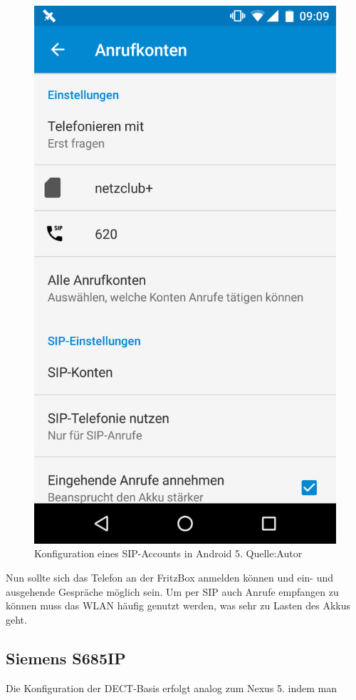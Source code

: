\documentclass[a4paper,12pt]{scrbook}
\begin{document}
\begin{figure}[H]
\begin{center}
\includegraphics[width=.4\hsize]{./images/voip-client-nexus5.png}
\end{center}
\caption[Konfiguration eines SIP-Accounts in Android 5]
{\label{voip-client-nexus5}Konfiguration eines SIP-Accounts in Android 5. Quelle:Autor}
\end{figure}


Nun sollte sich das Telefon an der FritzBox anmelden können und ein- und ausgehende Gespräche möglich sein.
Um per SIP auch Anrufe empfangen zu können muss das WLAN häufig genutzt werden, was sehr zu Lasten des Akkus geht.

\subsection{Siemens S685IP}
Die Konfiguration der DECT-Basis erfolgt analog zum Nexus 5. indem man 
\end{document}
